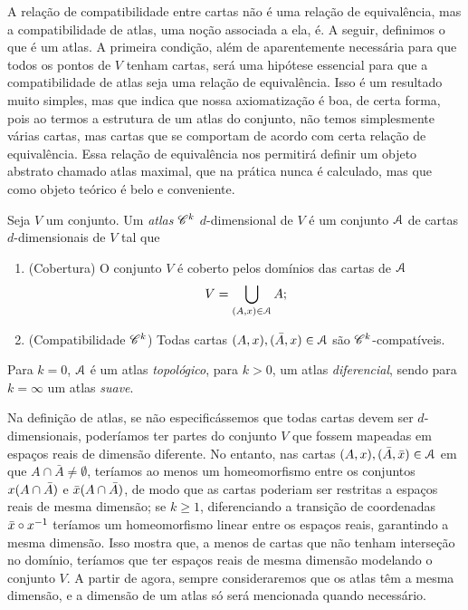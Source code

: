 A relação de compatibilidade entre cartas não é uma relação de equivalência, mas a compatibilidade de atlas, uma noção associada a ela, é. A seguir, definimos o que é um atlas. A primeira condição, além de aparentemente necessária para que todos os pontos de $V$ tenham cartas, será uma hipótese essencial para que a compatibilidade de atlas seja uma relação de equivalência. Isso é um resultado muito simples, mas que indica que nossa axiomatização é boa, de certa forma, pois ao termos a estrutura de um atlas do conjunto, não temos simplesmente várias cartas, mas cartas que se comportam de acordo com certa relação de equivalência. Essa relação de equivalência nos permitirá definir um objeto abstrato chamado atlas maximal, que na prática nunca é calculado, mas que como objeto teórico é belo e conveniente.

\begin{definition}
Seja $V$ um conjunto. Um \emph{atlas} $\mathscr{C}^k$ $d$-dimensional de $V$ é um conjunto $\mathcal{A}$ de cartas $d$-dimensionais de $V$ tal que
	\begin{enumerate}
	\item (Cobertura) O conjunto $V$ é coberto pelos domínios das cartas de $\mathcal{A}$
	\begin{equation*}
	V = \displaystyle\bigcup_{(A,x) \in \mathcal{A}} A;
	\end{equation*}
	\item (Compatibilidade $\mathscr{C}^k$) Todas cartas $(A,x), (\bar A,x) \in \mathcal{A}$  são $\mathscr{C}^k$-compatíveis.
	\end{enumerate}
Para $k=0$, $\mathcal{A}$ é um atlas \emph{topológico}, para $k>0$, um atlas \emph{diferencial}, sendo para $k=\infty$ um atlas \emph{suave}.
\end{definition}

Na definição de atlas, se não especificássemos que todas cartas devem ser $d$-dimensionais, poderíamos ter partes do conjunto $V$ que fossem mapeadas em espaços reais de dimensão diferente. No entanto, nas cartas $(A,x), (\bar A,\bar {x}) \in \mathcal{A}$ em que $A \cap \bar A \neq \emptyset$, teríamos ao menos um homeomorfismo entre os conjuntos $x(A \cap \bar A)$ e $\bar{x}(A \cap \bar A)$, de modo que as cartas poderiam ser restritas a espaços reais de mesma dimensão; se $k \geq 1$, diferenciando a transição de coordenadas $\bar{x} \circ x^{-1}$ teríamos um homeomorfismo linear entre os espaços reais, garantindo a mesma dimensão. Isso mostra que, a menos de cartas que não tenham interseção no domínio, teríamos que ter espaços reais de mesma dimensão modelando o conjunto $V$. A partir de agora, sempre consideraremos que os atlas têm a mesma dimensão, e a dimensão de um atlas só será mencionada quando necessário.

